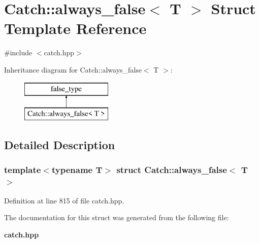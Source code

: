 \section{Catch\+::always\+\_\+false$<$ T $>$ Struct Template Reference}
\label{struct_catch_1_1always__false}


{\ttfamily \#include $<$catch.\+hpp$>$}

Inheritance diagram for Catch\+::always\+\_\+false$<$ T $>$\+:\begin{figure}[H]
\begin{center}
\leavevmode
\includegraphics[height=2.000000cm]{struct_catch_1_1always__false}
\end{center}
\end{figure}


\subsection{Detailed Description}
\subsubsection*{template$<$typename T$>$\newline
struct Catch\+::always\+\_\+false$<$ T $>$}



Definition at line 815 of file catch.\+hpp.



The documentation for this struct was generated from the following file\+:\begin{DoxyCompactItemize}
\item 
\textbf{ catch.\+hpp}\end{DoxyCompactItemize}

